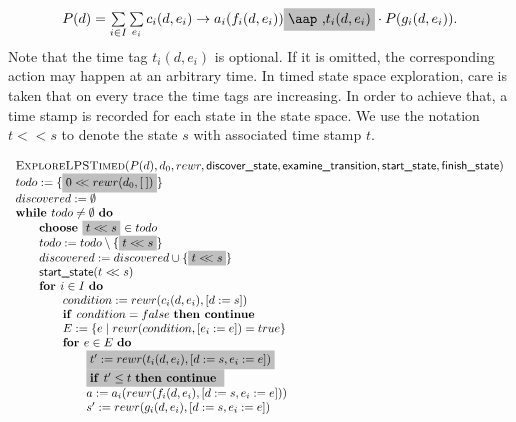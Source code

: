 \documentclass{article}
\newcommand{\at}[1]{\mbox{\aap ,} #1}
\newcommand{\aftertime}{\ensuremath{<\!\!<}}
\newcommand{\Space}{\text{\ }}
\newcommand{\If}{\text{\textbf{if }}}
\newcommand{\Do}{\text{\textbf{do }}}
\newcommand{\Then}{\text{\textbf{then }}}
\newcommand{\For}{\text{\textbf{for }}}
\newcommand{\While}{\text{\textbf{while }}}
\newcommand{\Continue}{\text{\textbf{continue }}}
\newcommand{\Choose}{\text{\textbf{choose }}}
\begin{document}
\[
\begin{array}{l}
P(d)=
\sum\limits_{i\in I}\sum\limits_{e_i}c_i(d, e_i)\rightarrow a_i(f_i(d,e_i))
\colorbox{lightgray}{$\at t_i(d,e_i)$}
\cdot P(g_i(d,e_i)).
\end{array}
\]
Note that the time tag $t_i(d,e_i)$ is optional. If it is omitted, the corresponding action may happen at an arbitrary time. In timed state space exploration, care is taken that on every trace the time tags are
increasing. In order to achieve that, a time stamp is recorded for each state
in the state space. We use the notation $t \aftertime s$ to denote the state $s$
with associated time stamp $t$.

\[
\begin{tabular}{l}
\textsc{ExploreLPSTimed}($P(d), d_0, rewr, \textsf{discover\_state}, \textsf{examine\_transition},
\textsf{start\_state}, \textsf{finish\_state})$ \\
$todo := \{\colorbox{lightgray}{$0 \aftertime rewr(d_0, [\:])$}\}$ \\
$discovered := \emptyset$ \\
$\While todo \neq \emptyset \Space \Do$ \\
\qquad \Choose \colorbox{lightgray}{$t \aftertime s$} $\in todo$ \\
\qquad $todo := todo \setminus \{ \colorbox{lightgray}{$t \aftertime s$} \}$ \\
\qquad $discovered := discovered \cup \{ \colorbox{lightgray}{$t \aftertime s$} \}$ \\
\qquad $\textsf{start\_state}(t \aftertime s)$ \\
\qquad $\For i \in I  \Space \Do$ \\
\qquad \qquad $condition := rewr(c_i(d, e_i), [d := s])$ \\
\qquad \qquad $\If condition = false  \Space \Then \Continue$ \\
\qquad \qquad $E := \{ e \mid rewr(condition, [e_i := e]) = true \}$ \\
\qquad \qquad $\For e \in E  \Space \Do$ \\
\qquad \qquad \qquad \colorbox{lightgray}{$t' := rewr(t_i(d,e_i), [d:=s,e_i:=e])$} \\
\qquad \qquad \qquad \colorbox{lightgray}{$\If t' \leq t \Space \Then \Continue$} \\
\qquad \qquad \qquad $a := a_i(rewr(f_i(d,e_i), [d:=s,e_i:=e]))$ \\
\qquad \qquad \qquad $s' := rewr(g_i(d,e_i), [d:=s,e_i:=e])$ \\

\end{tabular}\]
\end{document}
